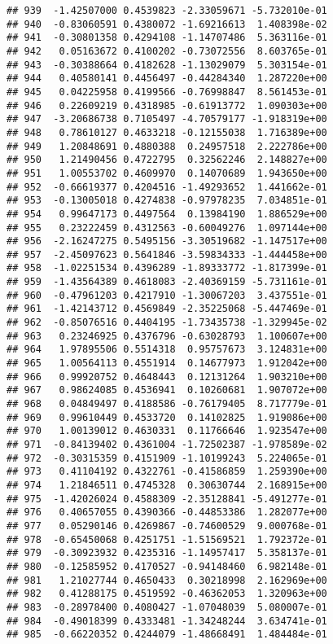 \documentclass[
]{article}
\begin{document}
\begin{verbatim}
## 939  -1.42507000 0.4539823 -2.33059671 -5.732010e-01
## 940  -0.83060591 0.4380072 -1.69216613  1.408398e-02
## 941  -0.30801358 0.4294108 -1.14707486  5.363116e-01
## 942   0.05163672 0.4100202 -0.73072556  8.603765e-01
## 943  -0.30388664 0.4182628 -1.13029079  5.303154e-01
## 944   0.40580141 0.4456497 -0.44284340  1.287220e+00
## 945   0.04225958 0.4199566 -0.76998847  8.561453e-01
## 946   0.22609219 0.4318985 -0.61913772  1.090303e+00
## 947  -3.20686738 0.7105497 -4.70579177 -1.918319e+00
## 948   0.78610127 0.4633218 -0.12155038  1.716389e+00
## 949   1.20848691 0.4880388  0.24957518  2.222786e+00
## 950   1.21490456 0.4722795  0.32562246  2.148827e+00
## 951   1.00553702 0.4609970  0.14070689  1.943650e+00
## 952  -0.66619377 0.4204516 -1.49293652  1.441662e-01
## 953  -0.13005018 0.4274838 -0.97978235  7.034851e-01
## 954   0.99647173 0.4497564  0.13984190  1.886529e+00
## 955   0.23222459 0.4312563 -0.60049276  1.097144e+00
## 956  -2.16247275 0.5495156 -3.30519682 -1.147517e+00
## 957  -2.45097623 0.5641846 -3.59834333 -1.444458e+00
## 958  -1.02251534 0.4396289 -1.89333772 -1.817399e-01
## 959  -1.43564389 0.4618083 -2.40369159 -5.731161e-01
## 960  -0.47961203 0.4217910 -1.30067203  3.437551e-01
## 961  -1.42143712 0.4569849 -2.35225068 -5.447469e-01
## 962  -0.85076516 0.4404195 -1.73435738 -1.329945e-02
## 963   0.23246925 0.4376796 -0.63028793  1.100607e+00
## 964   1.97895506 0.5514318  0.95757673  3.124831e+00
## 965   1.00564113 0.4551914  0.14677973  1.912042e+00
## 966   0.99920752 0.4648443  0.12131264  1.903210e+00
## 967   0.98624085 0.4536941  0.10260681  1.907072e+00
## 968   0.04849497 0.4188586 -0.76179405  8.717779e-01
## 969   0.99610449 0.4533720  0.14102825  1.919086e+00
## 970   1.00139012 0.4630331  0.11766646  1.923547e+00
## 971  -0.84139402 0.4361004 -1.72502387 -1.978589e-02
## 972  -0.30315359 0.4151909 -1.10199243  5.224065e-01
## 973   0.41104192 0.4322761 -0.41586859  1.259390e+00
## 974   1.21846511 0.4745328  0.30630744  2.168915e+00
## 975  -1.42026024 0.4588309 -2.35128841 -5.491277e-01
## 976   0.40657055 0.4390366 -0.44853386  1.282077e+00
## 977   0.05290146 0.4269867 -0.74600529  9.000768e-01
## 978  -0.65450068 0.4251751 -1.51569521  1.792372e-01
## 979  -0.30923932 0.4235316 -1.14957417  5.358137e-01
## 980  -0.12585952 0.4170527 -0.94148460  6.982148e-01
## 981   1.21027744 0.4650433  0.30218998  2.162969e+00
## 982   0.41288175 0.4519592 -0.46362053  1.320963e+00
## 983  -0.28978400 0.4080427 -1.07048039  5.080007e-01
## 984  -0.49018399 0.4333481 -1.34248244  3.634741e-01
## 985  -0.66220352 0.4244079 -1.48668491  1.484484e-01

\end{verbatim}
\end{document}
